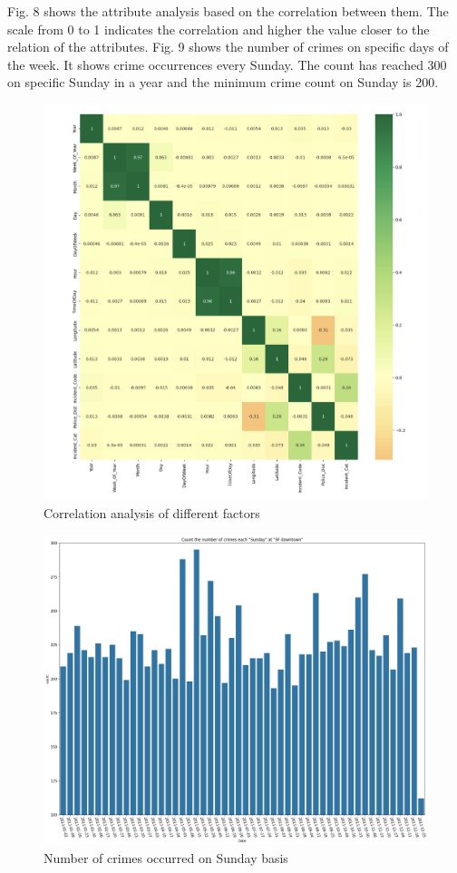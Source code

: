 \documentclass[11 pt,conference,final,]{IEEEtran}
\begin{document}
Fig. 8 shows the attribute analysis based on the correlation between
them. The scale from 0 to 1 indicates the correlation and higher the
value closer to the relation of the attributes. Fig. 9 shows the number
of crimes on specific days of the week. It shows crime occurrences every
Sunday. The count has reached 300 on specific Sunday in a year and the
minimum crime count on Sunday is 200.

\begin{figure}

{\centering \includegraphics[width=0.9\linewidth]{img/fig8} 

}

\caption{Correlation analysis of different factors}\label{fig:unnamed-chunk-8}
\end{figure}

\begin{figure}

{\centering \includegraphics[width=0.85\linewidth]{img/fig9} 

}

\caption{Number of crimes occurred on Sunday basis}\label{fig:unnamed-chunk-9}
\end{figure}
\end{document}
